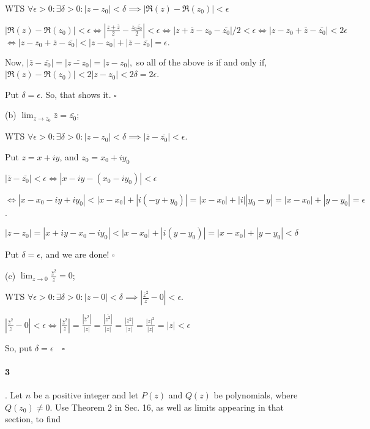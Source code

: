 \documentclass{article}
\begin{document}

WTS $\forall \epsilon > 0: \exists \delta > 0: |z-z_0|<\delta \implies
|\Re(z) - \Re(z_0)| < \epsilon$

$|\Re(z) - \Re(z_0)| < \epsilon \iff |\frac{z+\bar{z}}{2} - \frac{z_0
  \bar{z_0}}{2}| < \epsilon \iff |z + \bar{z} - z_0
  - \bar{z_0}|/2 <\epsilon \iff |z - z_0 +\bar{z} -
  \bar{z_0}| < 2\epsilon$
  $\iff  |z-z_0 +\bar{z}-\bar{z_0}| < |z-z_0| + |\bar{z} -
  \bar{z_0}| = \epsilon.$

  Now, $|\bar{z} -\bar{z_0}| = |\bar{z -z_0}| = |z-z_0|,$ so all of
  the above is if and only if, $|\Re(z)-\Re(z_0)|< 2|z-z_0| < 2\delta
  = 2\epsilon$.

  Put $\delta = \epsilon$.
  So, that shows it. $\square$

  (b) $\lim_{z\rightarrow z_0} \bar{z} = \bar{z_0}$;


  WTS $\forall \epsilon > 0:\exists \delta > 0: |z-z_0|< \delta
  \implies |\bar{z} - \bar{z_0}|<\epsilon$.

  Put $z = x + i y$, and $z_0 = x_0 + i y_0$

  $|\bar{z} - \bar{z_0}|<\epsilon \iff |x-iy - (x_0 -iy_0)|<\epsilon
  $

  $\iff |x-x_0 -iy+iy_0|<|x-x_0|+|i(-y+y_0)| = |x-x_0|+|i||y_0-y| =
  |x-x_0| +|y-y_0|= \epsilon$.

$|z-z_0|= |x+iy-x_0-iy_0| < |x-x_0|+|i(y-y_0)| =
|x-x_0|+|y-y_0|<\delta$

Put $\delta = \epsilon$, and we are done!
  $\square$

(c) $\lim_{z\rightarrow 0} \frac{\bar{z}^2}{z} = 0$;


WTS $\forall \epsilon > 0:\exists \delta > 0: |z-0|< \delta
\implies |\frac{\bar{z}^2}{z} - 0|<\epsilon$.

$|\frac{\bar{z}^2}{z} - 0|<\epsilon \iff |\frac{\bar{z}^2}{z}| =
\frac{|\bar{z}^2|}{|z|} =\frac{|\bar{z^2}|}{|z|} = \frac{|z^2|}{|z|} =
\frac{|z|^2}{|z|} = |z|<\epsilon$

So, put $\delta = \epsilon\quad \square$

\paragraph{3}. Let $n$ be a positive integer and let $P(z)$ and $Q(z)$ be polynomials, where $Q(z_0) \neq 0$.
Use Theorem 2 in Sec. 16, as well as limits appearing in that section,
to find
\end{document}
